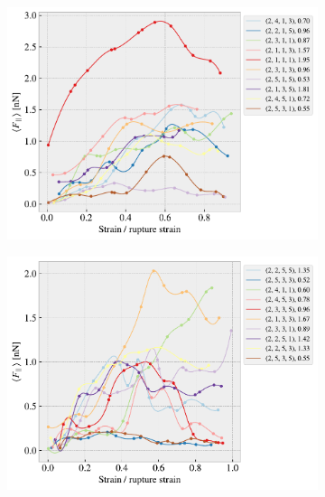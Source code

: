 \begin{figure}[H]
    \centering
    \begin{subfigure}[b]{0.49\textwidth}
        \centering
        \includegraphics[width=\textwidth]{figures/stretch_profiles/honeycomb/SP_0_honeycomb.pdf}
        \caption{}
    \end{subfigure}
    \hfill
    \begin{subfigure}[b]{0.49\textwidth}
        \centering
        \includegraphics[width=\textwidth]{figures/stretch_profiles/honeycomb/SP_1_honeycomb.pdf}
        \caption{}
    \end{subfigure}
    \hfill
    \begin{subfigure}[b]{0.49\textwidth}

\end{subfigure}
\end{figure}

